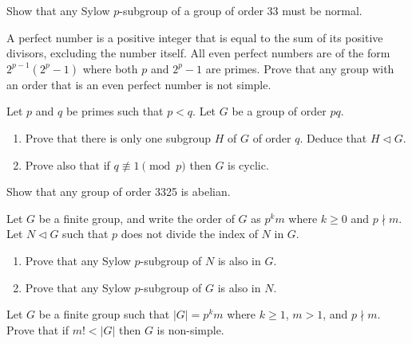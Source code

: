 \begin{problem}
    Show that any Sylow $p$-subgroup of a group of order 33 must be normal.
\end{problem}

\begin{problem}
    A perfect number is a positive integer that is equal to the sum of its positive divisors, excluding the number itself. All even perfect numbers are of the form $2^{p-1}\left(2^p-1\right)$ where both $p$ and $2^p-1$ are primes. Prove that any group with an order that is an even perfect number is not simple.
\end{problem}

\begin{problem}\label{problem-group-of-order-pq-has-normal-subgroup-of-order-q}
    Let $p$ and $q$ be primes such that $p < q$. Let $G$ be a group of order $pq$.
    \begin{enumerate}[label=(\roman*)]
        \item Prove that there is only one subgroup $H$ of $G$ of order $q$. Deduce that $H \lhd G$.
        \item Prove also that if $q \not\equiv 1 \pmod p$ then $G$ is cyclic.
    \end{enumerate}
\end{problem}

\begin{problem}
    Show that any group of order 3325 is abelian.
\end{problem}

\begin{problem}\label{problem-normal-subgroup-of-G-contains-all-sylow-p-subgroups}
    Let $G$ be a finite group, and write the order of $G$ as $p^km$ where $k \geq 0$ and $p \nmid m$. Let $N \lhd G$ such that $p$ does not divide the index of $N$ in $G$.
    \begin{enumerate}[label=(\roman*)]
        \item Prove that any Sylow $p$-subgroup of $N$ is also in $G$.
        \item Prove that any Sylow $p$-subgroup of $G$ is also in $N$.
    \end{enumerate}
\end{problem}

\begin{problem}\label{problem-if-m!<|G|-then-G-is-simple}
    Let $G$ be a finite group such that $|G| = p^km$ where $k \geq 1$, $m > 1$, and $p \nmid m$. Prove that if $m! < |G|$ then $G$ is non-simple.
\end{problem}

